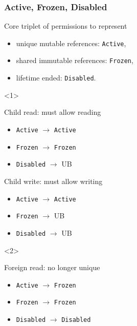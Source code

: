 \begin{frame}[t]
    \frametitle{Active, Frozen, Disabled}
    Core triplet of permissions to represent
    \begin{itemize}
        \item unique mutable references: \texttt{Active},
        \item shared immutable references: \texttt{Frozen},
        \item lifetime ended: \texttt{Disabled}.
    \end{itemize}

    \begin{onlyenv}<1>
        \begin{block}{Child read: must allow reading}
            \begin{itemize}
                \item \texttt{Active} \(\to\) \texttt{Active}
                \item \texttt{Frozen} \(\to\) \texttt{Frozen}
                \item \texttt{Disabled} \(\to\) UB
            \end{itemize}
        \end{block}

        \begin{block}{Child write: must allow writing}
            \begin{itemize}
                \item \texttt{Active} \(\to\) \texttt{Active}
                \item \texttt{Frozen} \(\to\) UB
                \item \texttt{Disabled} \(\to\) UB
            \end{itemize}
        \end{block}
    \end{onlyenv}

    \begin{onlyenv}<2>
        \begin{block}{Foreign read: no longer unique}
            \begin{itemize}
                \item \texttt{Active} \(\to\) \texttt{Frozen}
                \item \texttt{Frozen} \(\to\) \texttt{Frozen}
                \item \texttt{Disabled} \(\to\) \texttt{Disabled}
            \end{itemize}
        \end{block}


\end{onlyenv}
\end{frame}
